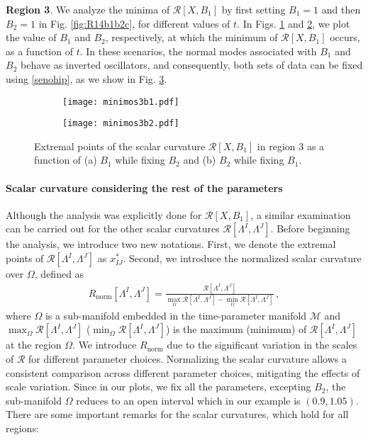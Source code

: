 \documentclass[12pt]{iopart}
\begin{document}
{\bf {Region 3}}. We analyze the minima of $\mathcal{R}[X,B_1]$ by first setting $B_1=1$ and then $B_2=1$ in Fig. \ref{fig:R14b1b2c}, for different values of $t$. In Figs. \ref{fig:minimosr3a} and \ref{fig:minimosr3b}, we plot the value of $B_1$ and $B_2$, respectively, at which the minimum of $\mathcal{R}[X,B_1]$ occurs, as a function of $t$. In these scenarios, the normal modes associated with $B_1$ and $B_2$ behave as inverted oscillators, and consequently, both sets of data can be fixed using \eqref{senohip}, as we show in Fig. \ref{fig:minimosr3}.


\begin{figure}[H]
  \centering
  \begin{subfigure}{0.45\linewidth}{\texttt{[image: minimos3b1.pdf]}}
    \caption{}
    \label{fig:minimosr3a}
  \end{subfigure}
  \begin{subfigure}{0.45\linewidth}\texttt{[image: minimos3b2.pdf]}
    \caption{}
    \label{fig:minimosr3b}  
  \end{subfigure}
  \captionsetup{font=small} 
  \caption{\justifying Extremal points of the scalar curvature $\mathcal{R}[X,B_1]$ in region 3 as a function of (a)  $B_1$ while fixing $B_2$ and (b) $B_2$ while fixing $B_1$. }  
    \label{fig:minimosr3}
\end{figure}



\paragraph{Scalar curvature considering the rest of the parameters \newline} 


Although the analysis was explicitly done for $\mathcal{R}[X, B_1]$, a similar examination can be carried out for the other scalar curvatures $\mathcal{R}[\Lambda^I,\Lambda^J]$. Before beginning the analysis, we introduce two new notations. First, we denote the extremal points of $\mathcal{R}[\Lambda^I,\Lambda^J]$ as $x^*_{IJ}$. Second, we introduce the normalized scalar curvature over $\Omega$,  defined as 
\begin{align}
R_{\text{norm}}[\Lambda^I,\Lambda^J]=\frac{\mathcal{R}[\Lambda^I,\Lambda^J]}{\max_{\Omega}\mathcal{R}[\Lambda^I,\Lambda^J]-\min_{\Omega}\mathcal{R}[\Lambda^I,\Lambda^J]} \,,
\end{align}
where $\Omega$ is a sub-manifold embedded in the time-parameter manifold $\mathcal{M}$ and $\max_{\Omega}\mathcal{R}[\Lambda^I,\Lambda^J]$ ($\min_{\Omega}\mathcal{R}[\Lambda^I,\Lambda^J]$) is the maximum (minimum) of $\mathcal{R}[\Lambda^I,\Lambda^J]$ at the region $\Omega$.  We introduce $R_{\text{norm}}$ due to the significant variation in the scales of $\mathcal{R}$ for different parameter choices. Normalizing the scalar curvature allows a consistent comparison across different parameter choices, mitigating the effects of scale variation. Since in our plots, we fix all the parameters, excepting $B_2$, the sub-manifold $\Omega$ reduces to an open interval which in our example is $(0.9,1.05)$. There are some important remarks for the scalar curvatures, which hold for all regions:
\end{document}
